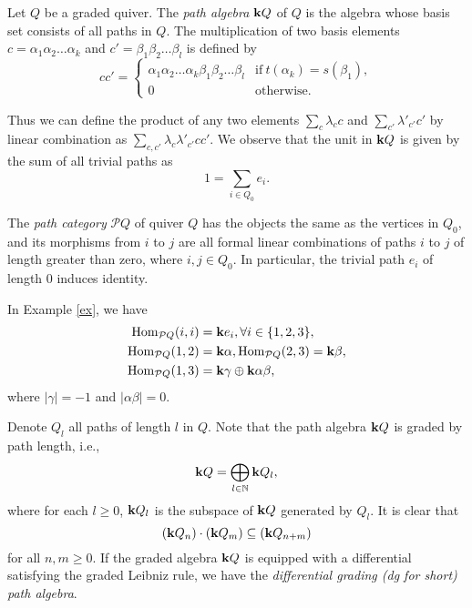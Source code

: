 \begin{definition}
  Let $Q$ be a graded quiver.
  The \textit{path algebra} $\mathbf{k} Q$ of $Q$ is the algebra
  whose basis set consists of all paths in $Q$.
  The multiplication of two basis elements $c=\alpha_1 \alpha_2 \ldots\alpha_k$
  and $c'= \beta_1 \beta_2\ldots\beta_l$ is defined by
  \begin{equation*}
    cc' =
    \begin{cases}
      \alpha_1 \alpha_2 \ldots \alpha_k \beta_1 \beta_2 \ldots \beta_l
        & \text{if} \ t(\alpha_k)= s(\beta_1),\\
      0 & \text{otherwise.}
    \end{cases}
  \end{equation*}

  Thus we can define the product of any two elements
  $\sum_{c} \lambda_c c$ and $\sum_{c'} \lambda'_{c'} c'$ by linear combination
  as $\sum_{c,c'} \lambda_c \lambda'_{c'} cc'$.
  We observe that the unit in $\mathbf{k} Q$ is given by the sum of all trivial paths as
  \[ 1 = \sum_{i\in Q_0} e_i. \]
\end{definition}

\begin{definition}
  The \textit{path category} $\mathcal{P}Q$ of quiver $Q$
  has the objects the same as the vertices in $Q_0$,
  and its morphisms from $i$ to $j$ are all formal linear combinations
  of paths $i$ to $j$ of length greater than zero, where $i,j \in Q_0$.
  In particular, the trivial path $e_i$ of length 0 induces identity.
\end{definition}
In Example \ref{ex}, we have
\begin{align*}
  \operatorname{Hom}_{\mathcal{P}Q}(i, i) &= \mathbf{k} e_i, \forall i \in \{1,2,3\},\\
  \operatorname{Hom}_{\mathcal{P}Q}(1, 2) &= \mathbf{k}\alpha, \operatorname{Hom}_{\mathcal{P}Q}(2, 3)= \mathbf{k} \beta, \\
  \operatorname{Hom}_{\mathcal{P}Q}(1,3) &= \mathbf{k} \gamma \oplus \mathbf{k} \alpha \beta,
\end{align*}
where $|\gamma| = -1$ and $|\alpha\beta| = 0$.

Denote $Q_l$ all paths of length $l$ in $Q$.
Note that the path algebra $\mathbf{k} Q$ is graded by path length, i.e.,
\[ \mathbf{k} Q = \bigoplus_{l \in \mathbb{N}} \mathbf{k} Q_l, \]
where for each $l \geqslant 0$, $\mathbf{k} Q_{l}$ is
the subspace of $\mathbf{k} Q$ generated by $Q_{l}$.
It is clear that 
\[ (\mathbf{k} Q_{n}) \cdot (\mathbf{k} Q_{m}) \subseteq (\mathbf{k} Q_{n+m}) \]
for all $n, m \geqslant 0$.
If the graded algebra $\mathbf{k} Q$ is equipped with a differential
satisfying the graded Leibniz rule,
we have the \textit{differential grading (dg for short) path algebra}.

